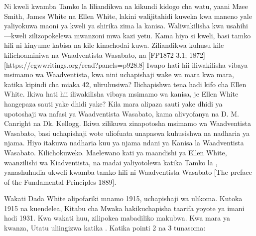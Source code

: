 Ni kweli kwamba Tamko la  liliandikwa na kikundi kidogo cha watu, yaani Mzee Smith, James White na Ellen White, lakini walijitahidi kuweka kwa maneno yale yaliyokuwa maoni ya kweli ya shirika zima la kanisa. Waliwakilisha kwa usahihi —kweli zilizopokelewa mwanzoni mwa kazi yetu. Kama hiyo si kweli, basi tamko hili ni kinyume kabisa na kile kinachodai kuwa. Ziliandikwa  kuhusu kile kilichoaminiwa na Waadventista Wasabato,  na [FP1872 3.1; 1872][https://egwwritings.org/read?panels=p928.8] Iwapo hati hii iliwakilisha vibaya msimamo wa Waadventista, kwa nini uchapishaji wake wa mara kwa mara, katika kipindi cha miaka 42, uliruhusiwa? Ilichapishwa tena hadi kifo cha Ellen White. Ikiwa hati hii iliwakilisha vibaya msimamo wa kanisa, je Ellen White hangepaza sauti yake dhidi yake? Kila mara alipaza sauti yake dhidi ya upotoshaji wa nafasi ya Waadventista Wasabato, kama alivyofanya na D. M. Canright na Dk. Kellogg. Ikiwa  zilikuwa zinapotosha msimamo wa Waadventista Wasabato, basi uchapishaji wote uliofuata unapaswa kuhusishwa na nadharia ya njama. Hiyo itakuwa nadharia kuu ya njama ndani ya Kanisa la Waadventista Wasabato. Kilichokuweko. Maelewano kati ya maandishi ya Ellen White, waanzilishi wa Kiadventista, na madai yaliyotolewa katika Tamko la , yanashuhudia ukweli kwamba tamko hili ni  Waadventista Wasabato [The preface of the Fundamental Principles 1889].

Wakati Dada White alipofariki mnamo 1915, uchapishaji wa  ulikoma. Kutoka 1915 na kuendelea, Kitabu cha Mwaka hakikuchapisha taarifa yoyote ya imani hadi 1931. Kwa wakati huu,  zilipokea mabadiliko makubwa. Kwa mara ya kwanza, Utatu uliingizwa katika . Katika pointi 2 na 3 tunasoma:



